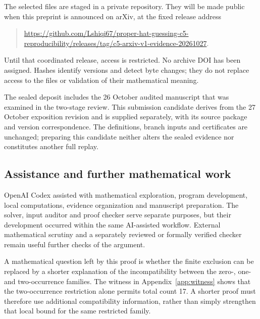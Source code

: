 The selected files are staged in a private repository. They will be made
public when this preprint is announced on arXiv, at the fixed release address
\begin{quote}\small\raggedright
\url{https://github.com/Lshiqi67/proper-hat-guessing-c5-reproducibility/releases/tag/c5-arxiv-v1-evidence-20261027}.
\end{quote}
Until that coordinated release, access is restricted. No archive DOI has
been assigned. Hashes identify versions and detect byte changes; they do
not replace access to the files or validation of their mathematical meaning.

The sealed deposit includes the 26 October audited manuscript that was
examined in the two-stage review. This submission candidate derives from
the 27 October exposition revision and is supplied separately, with its
source package and version correspondence. The definitions, branch inputs
and certificates are unchanged; preparing this candidate neither alters
the sealed evidence nor constitutes another full replay.

\subsection{Assistance and further mathematical work}
OpenAI Codex assisted with mathematical exploration, program development,
local computations, evidence organization and manuscript preparation.
The solver, input auditor and proof checker serve separate purposes,
but their development occurred within the same AI-assisted workflow.
External mathematical scrutiny and a separately reviewed or formally
verified checker remain useful further checks of the argument.

A mathematical question left by this proof is whether the finite
exclusion can be replaced by a shorter explanation of the incompatibility
between the zero-, one- and two-occurrence families. The witness in
Appendix~\ref{app:witness} shows that the two-occurrence restriction alone
permits total count 17. A shorter proof must therefore use additional
compatibility information, rather than simply strengthen that local
bound for the same restricted family.
